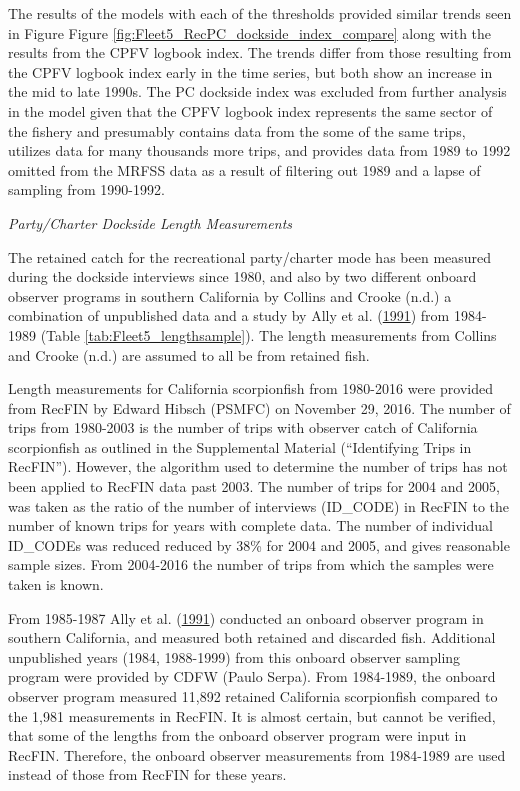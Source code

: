 \documentclass[12pt,]{article}
\begin{document}
The results of the models with each of the thresholds provided similar
trends seen in Figure Figure
\ref{fig:Fleet5_RecPC_dockside_index_compare} along with the results
from the CPFV logbook index. The trends differ from those resulting from
the CPFV logbook index early in the time series, but both show an
increase in the mid to late 1990s. The PC dockside index was excluded
from further analysis in the model given that the CPFV logbook index
represents the same sector of the fishery and presumably contains data
from the some of the same trips, utilizes data for many thousands more
trips, and provides data from 1989 to 1992 omitted from the MRFSS data
as a result of filtering out 1989 and a lapse of sampling from
1990-1992.

\emph{Party/Charter Dockside Length Measurements}

The retained catch for the recreational party/charter mode has been
measured during the dockside interviews since 1980, and also by two
different onboard observer programs in southern California by Collins
and Crooke (n.d.) a combination of unpublished data and a study by Ally
et al. (\protect\hyperlink{ref-Ally1991}{1991}) from 1984-1989 (Table
\ref{tab:Fleet5_lengthsample}). The length measurements from Collins and
Crooke (n.d.) are assumed to all be from retained fish.

Length measurements for California scorpionfish from 1980-2016 were
provided from RecFIN by Edward Hibsch (PSMFC) on November 29, 2016. The
number of trips from 1980-2003 is the number of trips with observer
catch of California scorpionfish as outlined in the Supplemental
Material (``Identifying Trips in RecFIN''). However, the algorithm used
to determine the number of trips has not been applied to RecFIN data
past 2003. The number of trips for 2004 and 2005, was taken as the ratio
of the number of interviews (ID\_CODE) in RecFIN to the number of known
trips for years with complete data. The number of individual ID\_CODEs
was reduced reduced by 38\% for 2004 and 2005, and gives reasonable
sample sizes. From 2004-2016 the number of trips from which the samples
were taken is known.

From 1985-1987 Ally et al. (\protect\hyperlink{ref-Ally1991}{1991})
conducted an onboard observer program in southern California, and
measured both retained and discarded fish. Additional unpublished years
(1984, 1988-1999) from this onboard observer sampling program were
provided by CDFW (Paulo Serpa). From 1984-1989, the onboard observer
program measured 11,892 retained California scorpionfish compared to the
1,981 measurements in RecFIN. It is almost certain, but cannot be
verified, that some of the lengths from the onboard observer program
were input in RecFIN. Therefore, the onboard observer measurements from
1984-1989 are used instead of those from RecFIN for these years.
\end{document}
